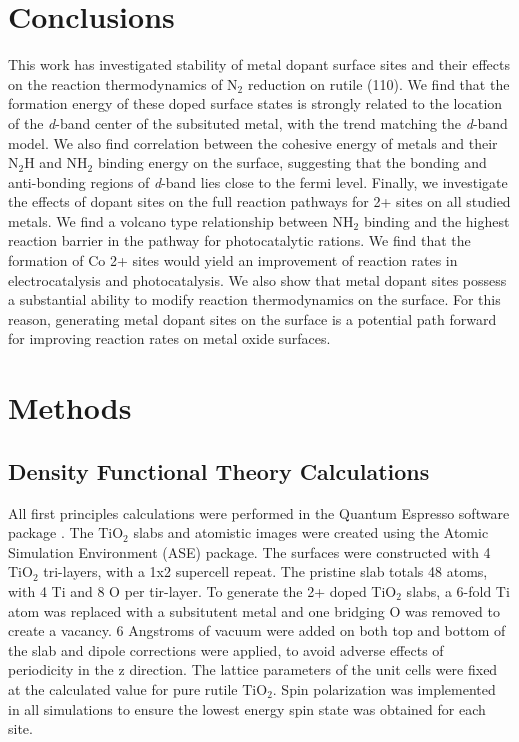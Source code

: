 \section{Conclusions}
This work has investigated stability of metal dopant surface sites and their effects on the reaction thermodynamics of N$_2$ reduction on rutile (110). We find that the formation energy of these doped surface states is strongly related to the location of the \textit{d}-band center of the subsituted metal, with the trend matching the \textit{d}-band model. We also find correlation between the cohesive energy of metals and their N$_2$H and NH$_2$ binding energy on the surface, suggesting that the bonding and anti-bonding regions of \textit{d}-band lies close to the fermi level. Finally, we investigate the effects of dopant sites on the full reaction pathways for 2+ sites on all studied metals. We find a volcano type relationship between NH$_2$ binding and the highest reaction barrier in the pathway for photocatalytic rations. We find that the formation of Co 2+ sites would yield an improvement of reaction rates in electrocatalysis and photocatalysis. We also show that metal dopant sites possess a substantial ability to modify reaction thermodynamics on the surface. For this reason, generating metal dopant sites on the surface is a potential path forward for improving reaction rates on metal oxide surfaces.


\section{Methods}
\label{sec:methods}

\subsection{Density Functional Theory Calculations}
All first principles calculations were performed in the Quantum Espresso software package \cite{QE-2009}.
The TiO$_2$ slabs and atomistic images were created using the Atomic Simulation Environment (ASE) package\cite{Hjorth_Larsen_2017}. The surfaces were constructed with 4 TiO$_2$ tri-layers, with a 1x2 supercell repeat. The pristine slab totals 48 atoms, with 4 Ti and 8 O per tir-layer. To generate the 2+ doped TiO$_2$ slabs, a 6-fold Ti atom was replaced with a subsitutent metal and one bridging O was removed to create a vacancy. 6 Angstroms of vacuum were added on both top and bottom of the slab and dipole corrections were applied, to avoid adverse effects of periodicity in the z direction. The lattice parameters of the unit cells were fixed at the calculated value for pure rutile TiO$_2$. Spin polarization was implemented in all simulations to ensure the lowest energy spin state was obtained for each site.

